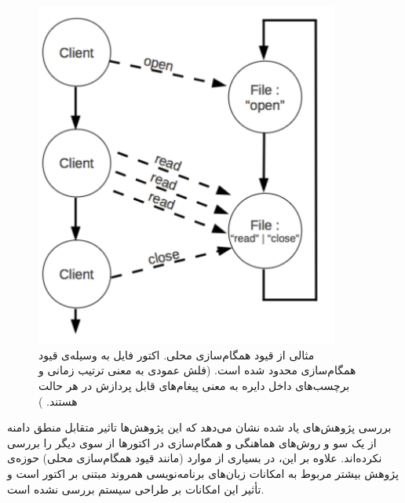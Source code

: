 \begin{figure}
    \begin{center}
	\includegraphics[width=10cm]{3-RelatedWork/Figures/LSC.pdf}
    \end{center}
    \caption[مثالی از قیود همگام‌سازی محلی]{\label{fig:lsc} مثالی از قیود همگام‌سازی محلی. اکتور فایل به وسیله‌ی قیود همگام‌سازی محدود شده است. (فلش عمودی به معنی ترتیب زمانی و برچسب‌های داخل دایره به معنی پیغام‌های قابل پردازش در هر حالت هستند. ) }
\end{figure}
 بررسی پژوهش‌های یاد شده نشان می‌دهد که این پژوهش‌ها تاثیر متقابل منطق دامنه از یک سو و روش‌های هماهنگی و همگام‌سازی در اکتورها از سوی دیگر را بررسی نکرده‌اند. علاوه بر این، در بسیاری از موارد (مانند قیود همگام‌سازی محلی) حوزه‌ی پژوهش بیشتر مربوط به امکانات زبان‌های برنامه‌نویسی همروند مبتنی بر اکتور است و تأثیر این امکانات بر طراحی سیستم بررسی نشده است.
 
